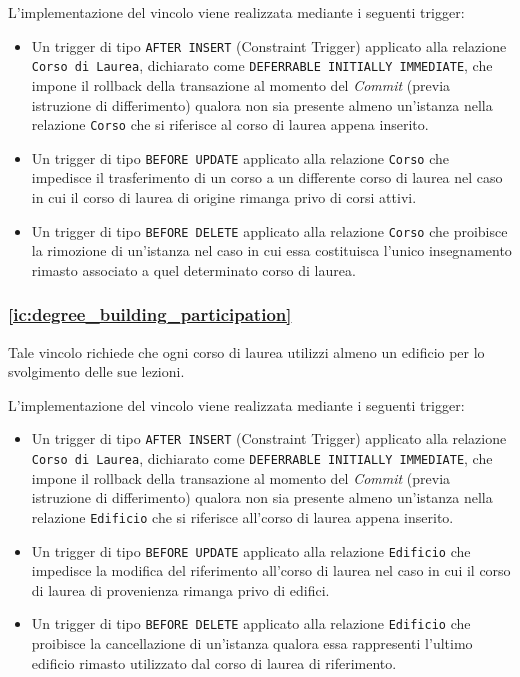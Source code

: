 \documentclass[a4paper,11pt]{article}
\begin{document}
L'implementazione del vincolo viene realizzata mediante i seguenti trigger:
\begin{itemize}
    \item Un trigger di tipo \texttt{AFTER INSERT} (Constraint Trigger) applicato alla relazione \texttt{Corso di Laurea}, dichiarato come \texttt{DEFERRABLE INITIALLY IMMEDIATE}, che impone il rollback della transazione al momento del \textit{Commit} (previa istruzione di differimento) qualora non sia presente almeno un'istanza nella relazione \texttt{Corso} che si riferisce al corso di laurea appena inserito.
    \item Un trigger di tipo \texttt{BEFORE UPDATE} applicato alla relazione \texttt{Corso} che impedisce il trasferimento di un corso a un differente corso di laurea nel caso in cui il corso di laurea di origine rimanga privo di corsi attivi.
    \item Un trigger di tipo \texttt{BEFORE DELETE} applicato alla relazione \texttt{Corso} che proibisce la rimozione di un'istanza nel caso in cui essa costituisca l'unico insegnamento rimasto associato a quel determinato corso di laurea.
\end{itemize}

\subsubsection{\ref{ic:degree_building_participation}}

Tale vincolo richiede che ogni corso di laurea utilizzi almeno un edificio per lo svolgimento delle sue lezioni.

L'implementazione del vincolo viene realizzata mediante i seguenti trigger:
\begin{itemize}
    \item Un trigger di tipo \texttt{AFTER INSERT} (Constraint Trigger) applicato alla relazione \texttt{Corso di Laurea}, dichiarato come \texttt{DEFERRABLE INITIALLY IMMEDIATE}, che impone il rollback della transazione al momento del \textit{Commit} (previa istruzione di differimento) qualora non sia presente almeno un'istanza nella relazione \texttt{Edificio} che si riferisce all'corso di laurea appena inserito.
    \item Un trigger di tipo \texttt{BEFORE UPDATE} applicato alla relazione \texttt{Edificio} che impedisce la modifica del riferimento all'corso di laurea nel caso in cui il corso di laurea di provenienza rimanga privo di edifici.
    \item Un trigger di tipo \texttt{BEFORE DELETE} applicato alla relazione \texttt{Edificio} che proibisce la cancellazione di un'istanza qualora essa rappresenti l'ultimo edificio rimasto utilizzato dal corso di laurea di riferimento.
\end{itemize}
\end{document}
